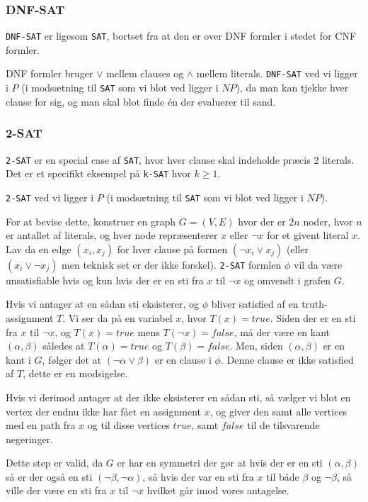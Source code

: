 \documentclass[danish,a4paper,article,12pt]{article}
\begin{document}
\subsubsection{DNF-SAT}
\texttt{DNF-SAT} er ligesom \texttt{SAT}, bortset fra at den er over DNF formler i stedet for CNF formler.

DNF formler bruger $\vee$ mellem clauses og $\wedge$ mellem literals. \texttt{DNF-SAT} ved vi ligger i $P$ (i modsætning til \texttt{SAT} som vi blot ved ligger i $NP$), da man kan tjekke hver clause for sig, og man skal blot finde én der evaluerer til sand.

\subsubsection{2-SAT}
\texttt{2-SAT} er en special case af \texttt{SAT}, hvor hver clause skal indeholde præcis $2$ literals. Det er et specifikt eksempel på \texttt{k-SAT} hvor $k\geq 1$.

\texttt{2-SAT} ved vi ligger i $P$ (i modsætning til \texttt{SAT} som vi blot ved ligger i $NP$).

For at bevise dette, konstruer en graph $G=(V,E)$ hvor der er $2n$ noder, hvor $n$ er antallet af literals, og hver node repræsenterer $x$ eller $\neg x$ for et givent literal $x$. Lav da en edge $(x_i,x_j)$ for hver clause på formen $(\neg x_i \vee x_j)$ (eller $(x_i \vee \neg x_j)$ men teknisk set er der ikke forskel). \texttt{2-SAT} formlen $\phi$ vil da være unsatisfiable hvis og kun hvis der er en sti fra $x$ til $\neg x$ og omvendt i grafen $G$.

Hvis vi antager at en sådan sti eksisterer, og $\phi$ bliver satisfied af en truth-assignment $T$. Vi ser da på en variabel $x$, hvor $T(x)=true$. Siden der er en sti fra $x$ til $\neg x$, og $T(x)=true$ mens $T(\neg x)=false$, må der være en kant $(\alpha, \beta)$ således at $T(\alpha)=true$ og $T(\beta)=false$. Men, siden $(\alpha, \beta)$ er en kant i $G$, følger det at $(\neg \alpha \vee \beta)$ er en clause i $\phi$. Denne clause er ikke satisfied af $T$, dette er en modsigelse.

Hvis vi derimod antager at der ikke eksisterer en sådan sti, så vælger vi blot en vertex der endnu ikke har fået en assignment $x$, og giver den samt alle vertices med en path fra $x$ og til disse vertices $true$, samt $false$ til de tilsvarende negeringer.

Dette step er valid, da $G$ er har en symmetri der gør at hvis der er en sti $(\alpha, \beta)$ så er der også en sti $(\neg \beta, \neg \alpha)$, så hvis der var en sti fra $x$ til både $\beta$ og $\neg \beta$, så ville der være en sti fra $x$ til $\neg x$ hvilket går imod vores antagelse.
\end{document}

